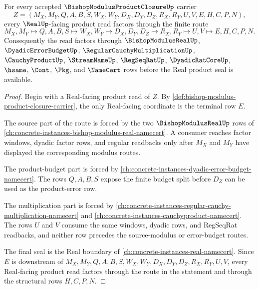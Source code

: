 \begin{theorem}
\label{thm:bishop-modulus-product-closure-real-product-seal}
For every accepted $\BishopModulusProductClosureUp$ carrier
$$
Z=(M_X,M_Y,Q,A,B,S,W_X,W_Y,D_X,D_Y,D_Z,R_X,R_Y,U,V,E,H,C,P,N),
$$
every $\RealUp$-facing product read factors through the finite route
$$
M_X,M_Y \longmapsto Q,A,B,S \longmapsto W_X,W_Y \longmapsto D_X,D_Y,D_Z \longmapsto R_X,R_Y \longmapsto U,V \longmapsto E,H,C,P,N .
$$
Consequently the read factors through $\BishopModulusRealUp$, $\DyadicErrorBudgetUp$, $\RegularCauchyMultiplicationUp$, $\CauchyProductUp$, $\StreamNameUp$, $\RegSeqRatUp$, $\DyadicRatCoreUp$, $\hsame$, $\Cont$, $\Pkg$, and $\NameCert$ rows before the Real product seal is available.
\end{theorem}
\begin{proof}
Begin with a Real-facing product read of $Z$. By \autoref{def:bishop-modulus-product-closure-carrier}, the only Real-facing coordinate is the terminal row $E$.

The source part of the route is forced by the two $\BishopModulusRealUp$ rows of \autoref{ch:concrete-instances-bishop-modulus-real-namecert}. A consumer reaches factor windows, dyadic factor rows, and regular readbacks only after $M_X$ and $M_Y$ have displayed the corresponding modulus routes.

The product-budget part is forced by \autoref{ch:concrete-instances-dyadic-error-budget-namecert}. The rows $Q,A,B,S$ expose the finite budget split before $D_Z$ can be used as the product-error row.

The multiplication part is forced by \autoref{ch:concrete-instances-regular-cauchy-multiplication-namecert} and \autoref{ch:concrete-instances-cauchyproduct-namecert}. The rows $U$ and $V$ consume the same windows, dyadic rows, and RegSeqRat readbacks, and neither row precedes the source-modulus or error-budget routes.

The final seal is the Real boundary of \autoref{ch:concrete-instances-real-namecert}. Since $E$ is downstream of $M_X,M_Y,Q,A,B,S,W_X,W_Y,D_X,D_Y,D_Z,R_X,R_Y,U,V$, every Real-facing product read factors through the route in the statement and through the structural rows $H,C,P,N$.
\end{proof}


